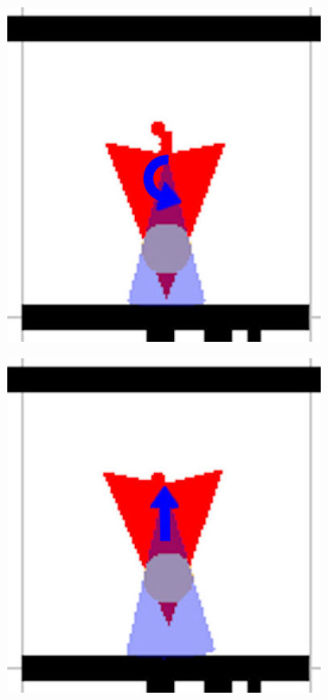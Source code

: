 \documentclass[t1]{penoverslag}
\begin{document}
\begin{figure}
\begin{subfigure}[hb]{0.2\textwidth}
        \end{subfigure}%
        \begin{subfigure}[hb]{0.2\textwidth}
                \centering
                \includegraphics[width=\textwidth]{muur4}
        \end{subfigure}%
        \begin{subfigure}[hb]{0.2\textwidth}
                \centering
                \includegraphics[width=\textwidth]{muur5}

\end{subfigure}
\end{figure}
\end{document}
